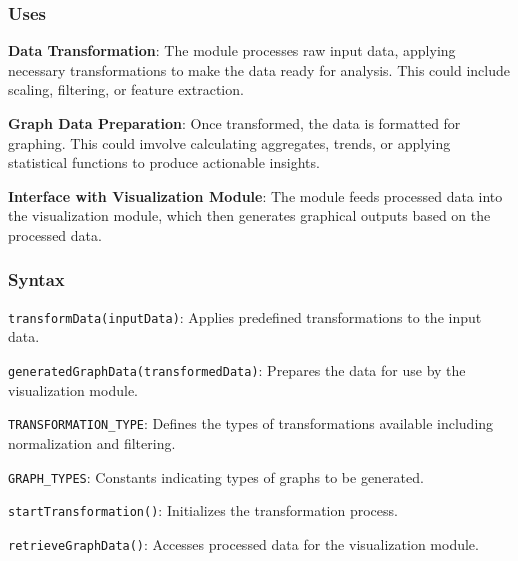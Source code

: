 \documentclass[12pt, titlepage]{article}
\begin{document}
\begin{description}
\subsubsection{Uses}
\begin{description}
  \item \textbf{Data Transformation}: The module processes raw input data, applying necessary transformations to make 
  the data ready for analysis. This could include scaling, filtering, or feature extraction.
  \item \textbf{Graph Data Preparation}: Once transformed, the data is formatted for graphing. This could imvolve calculating 
  aggregates, trends, or applying statistical functions to produce actionable insights.
  \item \textbf{Interface with Visualization Module}: The module feeds processed data into the visualization module, which 
  then generates graphical outputs based on the processed data.
\end{description}

\subsubsection{Syntax}
\begin{description}
  \item[Exported Operations:]
  \item
  \texttt{transformData(inputData)}: Applies predefined transformations to the input data.
  \item 
  \texttt{generatedGraphData(transformedData)}: Prepares the data for use by the visualization module.
  \item
  \item[Exported Constants:] 
  \item
  \texttt{TRANSFORMATION\_TYPE}: Defines the types of transformations available including normalization and filtering.
  \item 
  \texttt{GRAPH\_TYPES}: Constants indicating types of graphs to be generated.
  \item
  \item[Exported Access Programs:]
  \item 
  \texttt{startTransformation()}: Initializes the transformation process.
  \item 
  \texttt{retrieveGraphData()}: Accesses processed data for the visualization module.
\end{description}


\end{description}
\end{document}
